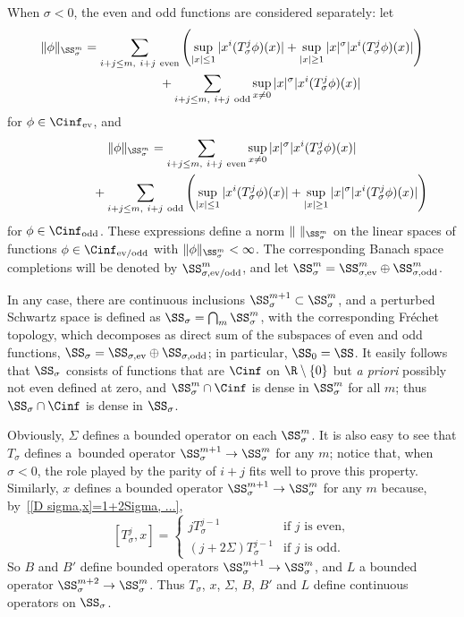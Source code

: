 When $\sigma<0$, the even and odd functions are considered separately: let
  \begin{gather}
    \|\phi\|_{\SS_\sigma^m}
    =\sum_{i+j\le m,\ i+j\ \text{even}}\left(\sup_{|x|\le1}|x^i(T_\sigma^j\phi)(x)|
    +\sup_{|x|\ge1}|x|^\sigma |x^i(T_\sigma^j\phi)(x)|\right)\nonumber\\
\hphantom{\|\phi\|_{\SS_\sigma^m}=}{}+\sum_{i+j\le m,\ i+j\ \text{odd}}\sup_{x\ne0}|x|^\sigma |x^i(T_\sigma^j\phi)(x)|\label{SS_sigma,even^m, sigma<0}
   \end{gather}
for $\phi\in\Cinf_{\text{\rm ev}}$, and
  \begin{gather}
    \|\phi\|_{\SS_\sigma^m}
    =\sum_{i+j\le m,\ i+j\ \text{even}}\sup_{x\ne0}|x|^\sigma |x^i(T_\sigma^j\phi)(x)|\nonumber\\
\hphantom{\|\phi\|_{\SS_\sigma^m}=}{}+\sum_{i+j\le m,\ i+j\ \text{odd}}\left(\sup_{|x|\le1}|x^i(T_\sigma^j\phi)(x)|
    +\sup_{|x|\ge1}|x|^\sigma |x^i(T_\sigma^j\phi)(x)|\right)\label{SS_sigma,odd^m, sigma<0}
  \end{gather}
for $\phi\in\Cinf_{\text{\rm odd}}$. These expressions def\/ine a norm
$\|\ \|_{\SS_\sigma^m}$ on the linear spaces of
functions $\phi\in\Cinf_{\text{\rm ev/odd}}$ with
$\|\phi\|_{\SS_\sigma^m}<\infty$. The corresponding
Banach space completions will be denoted by $\SS_{\sigma,\text{\rm
ev/odd}}^m$, and let $\SS_\sigma^m=\SS_{\sigma,\text{\rm ev}}^m\oplus\SS_{\sigma,\text{\rm odd}}^m$.

In any case, there are continuous inclusions
$\SS_\sigma^{m+1}\subset\SS_\sigma^m$, and a perturbed Schwartz space is def\/ined as $\SS_\sigma=\bigcap_m\SS_\sigma^m$, with the corresponding Fr\'echet topology, which decomposes as direct sum of the subspaces of even and odd functions, $\SS_\sigma=\SS_{\sigma,\text{\rm ev}}\oplus\SS_{\sigma,\text{\rm odd}}$; in particular, $\SS_0=\SS$.  It easily follows
that $\SS_\sigma$ consists of functions that are $\Cinf$ on $\R\setminus\{0\}$ but \textit{a priori} possibly not even def\/ined at zero, and $\SS_\sigma^m\cap\Cinf$ is dense in $\SS_\sigma^m$ for all $m$; thus $\SS_\sigma\cap\Cinf$ is dense in $\SS_\sigma$.

Obviously, $\Sigma$ def\/ines a bounded operator on each $\SS_\sigma^m$. It is also easy to see that $T_\sigma$ def\/ines a~bounded operator $\SS_\sigma^{m+1}\to\SS_\sigma^m$ for any $m$; notice that, when $\sigma<0$, the role played by the parity of $i+j$ f\/its well to prove this property. Similarly, $x$ def\/ines a bounded operator $\SS_\sigma^{m+1}\to\SS_\sigma^m$ for any $m$ because, by~\eqref{[D sigma,x]=1+2Sigma, ...},
  \[
    [T_\sigma^j,x]=
      \begin{cases}
        jT_\sigma^{j-1} & \text{if $j$ is even},\\
        (j+2\Sigma)T_\sigma^{j-1} & \text{if $j$ is odd}.
      \end{cases}
  \]
So $B$ and $B'$ def\/ine bounded operators $\SS_\sigma^{m+1}\to\SS_\sigma^m$, and $L$ a bounded operator $\SS_\sigma^{m+2}\to\SS_\sigma^m$. Thus $T_\sigma$, $x$, $\Sigma$, $B$, $B'$ and $L$ def\/ine continuous operators on $\SS_\sigma$.

